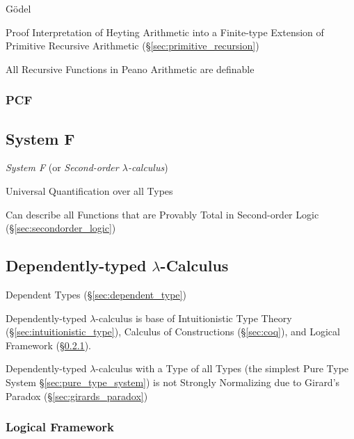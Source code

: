 G\"odel

Proof Interpretation of Heyting Arithmetic into a Finite-type
Extension of Primitive Recursive Arithmetic
(\S\ref{sec:primitive_recursion})

All Recursive Functions in Peano Arithmetic are definable



\subsubsection{PCF}\label{sec:pcf}



\subsection{System F}\label{sec:system_f}

\emph{System F} (or \emph{Second-order $\lambda$-calculus})

Universal Quantification over all Types

Can describe all Functions that are Provably Total in Second-order
Logic (\S\ref{sec:secondorder_logic})



\subsection{Dependently-typed $\lambda$-Calculus}
\label{sec:dependently_typed}

Dependent Types (\S\ref{sec:dependent_type})

Dependently-typed $\lambda$-calculus is base of Intuitionistic Type
Theory (\S\ref{sec:intuitionistic_type}), Calculus of Constructions
(\S\ref{sec:coq}), and Logical Framework
(\S\ref{sec:logical_framework}).

Dependently-typed $\lambda$-calculus with a Type of all Types (the
simplest Pure Type System \S\ref{sec:pure_type_system}) is not
Strongly Normalizing due to Girard's Paradox
(\S\ref{sec:girards_paradox})



\subsubsection{Logical Framework}\label{sec:logical_framework}



